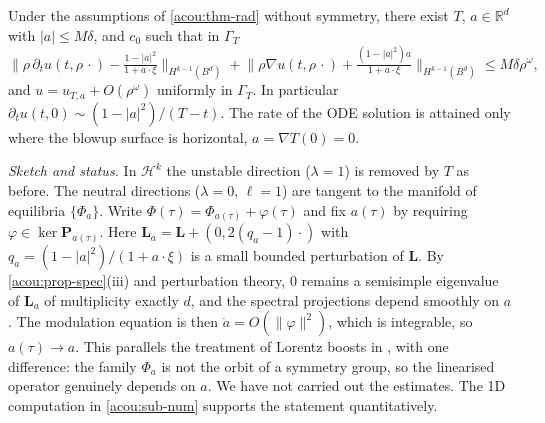 \begin{theorem}\label{acou:thm-nonrad}
Under the assumptions of \cref{acou:thm-rad} without symmetry, there exist $T$,
$a\in\mathbb R^d$ with $|a|\le M\delta$, and $c_0$ such that in $\Gamma_T$
\[
  \big\|\rho\,\partial_tu(t,\rho\,\cdot)-\tfrac{1-|a|^2}{1+a\cdot\xi}\big\|_{H^{k-1}(B^d)}
  +\big\|\rho\nabla u(t,\rho\,\cdot)+\tfrac{(1-|a|^2)a}{1+a\cdot\xi}\big\|_{H^{k-1}(B^d)}\le M\delta\rho^{\omega},
\]
and $u=u_{T,a}+O(\rho^\omega)$ uniformly in $\Gamma_T$. In particular
$\partial_tu(t,0)\sim(1-|a|^2)/(T-t)$. The rate of the ODE solution is
attained only where the blowup surface is horizontal, $a=\nabla T(0)=0$.
\end{theorem}
\emph{Sketch and status.} In $\mathcal H^k$ the unstable direction ($\lambda=1$) is
removed by $T$ as before. The neutral directions ($\lambda=0$, $\ell=1$) are
tangent to the manifold of equilibria $\{\Phi_a\}$. Write
$\Phi(\tau)=\Phi_{a(\tau)}+\varphi(\tau)$ and fix $a(\tau)$ by requiring
$\varphi\in\ker\mathbf P_{a(\tau)}$. Here $\mathbf L_a=\mathbf L+(0,2(q_a-1)\cdot)$
with $q_a=(1-|a|^2)/(1+a\cdot\xi)$ is a small bounded perturbation of
$\mathbf L$. By \cref{acou:prop-spec}(iii) and perturbation theory, $0$
remains a semisimple eigenvalue of $\mathbf L_a$ of multiplicity exactly
$d$, and the spectral projections depend smoothly on $a$. The modulation
equation is then $\dot a=O(\|\varphi\|^2)$, which is integrable, so
$a(\tau)\to a$. This parallels the treatment of Lorentz boosts in
\cite{DonningerSchoerkhuber2016,Ostermann2024}, with one difference: the
family $\Phi_a$ is not the orbit of a symmetry group, so the linearised
operator genuinely depends on $a$. We have not carried out the estimates.
The 1D computation in \cref{acou:sub-num} supports the statement
quantitatively.

